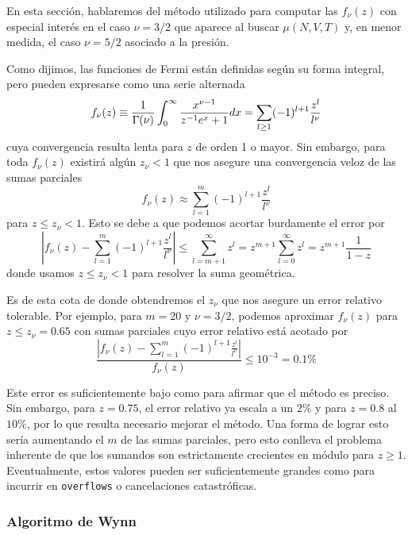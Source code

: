 En esta sección, hablaremos del método utilizado para computar las $f_\nu(z)$ con especial interés en el caso $\nu=3/2$ que aparece al buscar $\mu(N,V,T)$
y, en menor medida, el caso $\nu=5/2$ asociado a la presión.

Como dijimos, las funciones de Fermi están definidas según su forma integral, pero pueden expresarse como una serie alternada 
\begin{equation}{\label{eq:fermi_func_serie}}
 f_\nu(z) \equiv \frac{1}{\Gamma(\nu)}\int_0^\infty \frac{x^{\nu-1}}{z^{-1}e^x+1} dx = \sum_{l\geq 1} (-1)^{l+1}\frac{z^l}{l^\nu}
\end{equation}
cuya convergencia resulta lenta para $z$ de orden 1 o mayor.
Sin embargo, para toda $f_\nu(z)$ existirá algún $z_\nu < 1$ que nos asegure una convergencia veloz de las sumas parciales
\[ f_\nu(z) \approx \sum_{l=1}^{m} (-1)^{l+1}\frac{z^l}{l^\nu}\]
para $z\leq z_\nu < 1$.
Esto se debe a que podemos acortar burdamente el error por
\[ \left|f_\nu(z) - \sum_{l=1}^{m}(-1)^{l+1}\frac{z^l}{l^\nu}\right| \leq \sum_{l=m+1}^\infty z^l = z^{m+1}\sum_{l=0}^\infty z^l = z^{m+1} \frac{1}{1-z} \]
donde usamos $z\leq z_\nu < 1$ para resolver la suma geométrica.

Es de esta cota de donde obtendremos el $z_\nu$ que nos asegure un error relativo tolerable.
Por ejemplo, para $m=20$ y $\nu = 3/2$, podemos aproximar $f_\nu(z)$ para $z\leq z_\nu = 0.65$ con sumas parciales cuyo error relativo está acotado por
\[\frac{|f_\nu(z) - \sum_{l=1}^{m}(-1)^{l+1}\frac{z^l}{l^\nu}|}{f_\nu(z)} \leq 10^{-3} = 0.1\%\]

Este error es suficientemente bajo como para afirmar que el método es preciso.
Sin embargo, para $z = 0.75$, el error relativo ya escala a un $2\%$ y para $z=0.8$ al $10\%$, por lo que resulta necesario mejorar el método.
Una forma de lograr esto sería aumentando el $m$ de las sumas parciales, pero esto conlleva el problema inherente de que los sumandos son estrictamente crecientes en módulo para $z\geq 1$.
Eventualmente, estos valores pueden ser suficientemente grandes como para incurrir en \texttt{overflows} o cancelaciones catastróficas.

\subsubsection{Algoritmo de Wynn}

